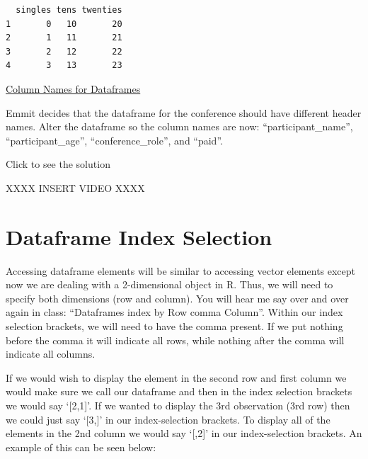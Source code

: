 \documentclass[
  letterpaper,
  DIV=11,
  numbers=noendperiod]{scrreprt}
\begin{document}
\begin{verbatim}
  singles tens twenties
1       0   10       20
2       1   11       21
3       2   12       22
4       3   13       23
\end{verbatim}

\begin{watch}{}{}
    \href{https://youtu.be/jzJfkWANAMU}{Column Names for Dataframes}
\end{watch}

\begin{tcolorbox}[enhanced jigsaw, colbacktitle=quarto-callout-tip-color!10!white, breakable, bottomrule=.15mm, colframe=quarto-callout-tip-color-frame, left=2mm, opacitybacktitle=0.6, title=\textcolor{quarto-callout-tip-color}{\faLightbulb}\hspace{0.5em}{Try it Out}, leftrule=.75mm, opacityback=0, rightrule=.15mm, titlerule=0mm, bottomtitle=1mm, colback=white, toprule=.15mm, arc=.35mm, toptitle=1mm, coltitle=black]

Emmit decides that the dataframe for the conference should have
different header names. Alter the dataframe so the column names are now:
``participant\_name'', ``participant\_age'', ``conference\_role'', and
``paid''.

Click to see the solution

XXXX INSERT VIDEO XXXX

\end{tcolorbox}

\section{Dataframe Index Selection}\label{dataframe-index-selection}

Accessing dataframe elements will be similar to accessing vector
elements except now we are dealing with a 2-dimensional object in R.
Thus, we will need to specify both dimensions (row and column). You will
hear me say over and over again in class: ``Dataframes index by Row
comma Column''. Within our index selection brackets, we will need to
have the comma present. If we put nothing before the comma it will
indicate all rows, while nothing after the comma will indicate all
columns.

If we would wish to display the element in the second row and first
column we would make sure we call our dataframe and then in the index
selection brackets we would say `{[}2,1{]}'. If we wanted to display the
3rd observation (3rd row) then we could just say `{[}3,{]}' in our
index-selection brackets. To display all of the elements in the 2nd
column we would say `{[},2{]}' in our index-selection brackets. An
example of this can be seen below:
\end{document}
